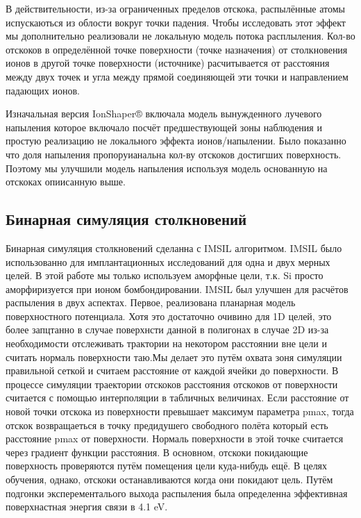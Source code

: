 \documentclass[a4paper,fontsize=12pt]{article}
\begin{document}
В действительности, из-за ограниченных пределов отскока, распылённые атомы испускаються из облости вокруг точки падения. Чтобы исследовать этот эффект мы дополнительно реализовали не локальную модель потока расплыления. Кол-во отскоков в определённой точке поверхности (точке назначения) от столкновения ионов в другой точке поверхности (источнике) расчитывается от расстояния между двух точек и угла между прямой соединяющей эти точки и направлением падающих ионов.

Изначальная версия IonShaper® включала модель вынужденного лучевого напыления которое включало посчёт предшествующей зоны наблюдения и простую реализацию не локального эффекта ионов/напылении. Было показанно что доля напыления пропоруианальна кол-ву отскоков достигших поверхность. Поэтому мы улучшили модель напыления используя модель основанную на отскоках опиисанную выше.

\subsection{Бинарная симуляция столкновений}

Бинарная симуляция столкновений сделанна с IMSIL алгоритмом. IMSIL было использованно для имплантационных исследований для одна и двух мерных целей. В этой работе мы только используем аморфные цели, т.к. Si просто аморфиризуется при ионом бомбондировании. IMSIL был улучшен для расчётов распыления в двух аспектах. Первое, реализована планарная модель поверхностного потенциала. Хотя это достаточно очивино для 1D целей, это более запцтанно в случае поверхнсти данной в полигонах в случае 2D из-за необходимости отслеживать трактории на некотором расстоянии вне цели и считать нормаль поверхности таю.Мы делает это путём охвата зоня симуляции правильной сеткой и считаем расстояние от каждой ячейки до поверхности. В процессе симуляции траектории отскоков расстояния отскоков от поверхности считается с помощью интерполяции в табличных величинах. Если расстояние от новой точки отскока из поверхности превышает максимум параметра pmax, тогда отскок возвращаеться в точку предидушего свободного полёта который есть расстояние pmax от поверхности. Нормаль поверхности в этой точке считается через градиент функции расстояния. В основном, отскоки покидающие поверхность проверяются путём помещения цели куда-нибудь ещё. В целях обучения, однако, отскоки останавливаются когда они покидают цель. Путём подгонки эксперементалього выхода распыления была определенна эффективная поверхнастная энергия связи в 4.1 eV.
\end{document}
